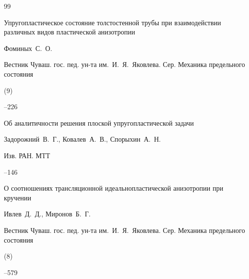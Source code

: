 \begin{thebibliography}{99}






\paper Упругопластическое состояние толстостенной трубы при взаимодействии различных видов пластической анизотропии

\by Фоминых~С.~О.

\jour Вестник Чуваш. гос. пед. ун-та им.~И.~Я.~Яковлева. Сер. Механика предельного состояния


(9)

--226







\paper Об аналитичности решения плоской упругопластической задачи

\by Задорожний~В.~Г., Ковалев~А.~В., Спорыхин~А.~Н.

\jour Изв. РАН. МТТ



--146










\paper О соотношениях трансляционной идеальнопластической анизотропии при кручении

\by Ивлев~Д.~Д., Миронов~Б.~Г.

\jour Вестник Чуваш. гос. пед. ун-та им.~И.~Я.~Яковлева. Сер. Механика предельного состояния


(8)

--579







\end{thebibliography}
